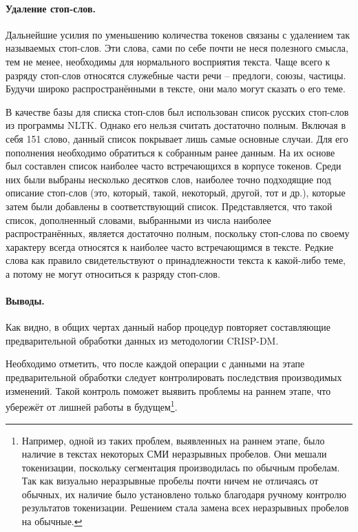 \paragraph{Удаление стоп-слов.}
Дальнейшие усилия по уменьшению количества токенов связаны с удалением так называемых стоп-слов. Эти слова, сами по себе почти не неся полезного смысла, тем не менее, необходимы для нормального восприятия текста. Чаще всего к разряду стоп-слов относятся служебные части речи -- предлоги, союзы, частицы. Будучи широко распространёнными в тексте, они мало могут сказать о его теме.

В качестве базы для списка стоп-слов был использован список русских стоп-слов из программы NLTK. Однако его нельзя считать достаточно полным. Включая в себя 151 слово, данный список покрывает лишь самые основные случаи. Для его пополнения необходимо обратиться к собранным ранее данным. На их основе был составлен список наиболее часто встречающихся в корпусе токенов. Среди них были выбраны несколько десятков слов, наиболее точно подходящие под описание стоп-слов (это, который, такой, некоторый, другой, тот и др.), которые затем были добавлены в соответствующий список. Представляется, что такой список, дополненный словами, выбранными из числа наиболее распространённых, является достаточно полным, поскольку стоп-слова по своему характеру всегда относятся к наиболее часто встречающимся в тексте. Редкие слова как правило свидетельствуют о принадлежности текста к какой-либо теме, а потому не могут относиться к разряду стоп-слов.


\paragraph{Выводы.}
Как видно, в общих чертах данный набор процедур повторяет составляющие предварительной обработки данных из методологии CRISP-DM.

Необходимо отметить, что после каждой операции с данными на этапе предварительной обработки следует контролировать последствия производимых изменений. Такой контроль поможет выявить проблемы на раннем этапе, что убережёт от лишней работы в будущем\footnote{Например, одной из таких проблем, выявленных на раннем этапе, было наличие в текстах некоторых СМИ неразрывных пробелов. Они мешали токенизации, поскольку сегментация производилась по обычным пробелам. Так как визуально неразрывные пробелы почти ничем не отличаясь от обычных, их наличие было установлено только благодаря ручному контролю результатов токенизации. Решением стала замена всех неразрывных пробелов на обычные.}.

